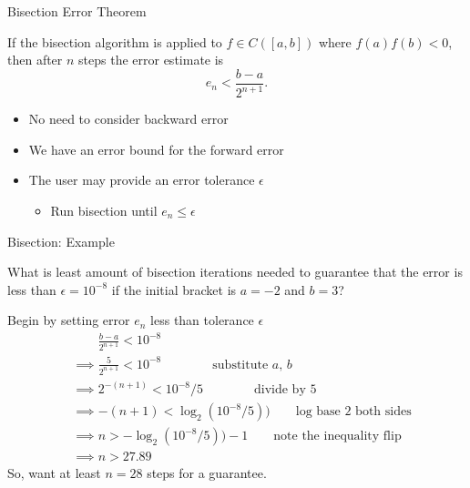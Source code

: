 \documentclass[10pt]{beamer}
\begin{document}
\begin{frame}{Bisection Error Theorem}

\begin{theorem}
    If the bisection algorithm is applied to $f\in C([a,b])$ where $f(a)f(b)<0$, then after $n$ steps the error estimate is 
    $$ e_n < \frac{b-a}{2^{n+1}}.$$
\end{theorem}
\vspace{4mm}
\begin{itemize}
    \item No need to consider backward error 
    \item We have an error bound for the forward error
    \item The user may provide an error tolerance $\epsilon$ 
    \begin{itemize}
        \item Run bisection until $e_n \le \epsilon$
    \end{itemize}
\end{itemize}


\end{frame}
\begin{frame}{Bisection: Example}

\begin{example}
What is least amount of bisection iterations needed to guarantee that the error is less than $\epsilon = 10^{-8}$ if the initial bracket is $a = -2$ and $b= 3$?
\end{example}

\vspace{3ex}
Begin by setting error $e_n$ less than tolerance $\epsilon $
\begin{align*}
&\phantom{\implies}\frac{b-a}{2^{n+1}}  < 10^{-8}\\
&\implies\frac{5}{2^{n+1}}  < 10^{-8} \qquad\qquad \mbox{substitute $a$, $b$}\\
&\implies{2^{-(n+1)}}  < 10^{-8}/5 \qquad\qquad \mbox{divide by 5}\\
&\implies -(n+1)  < \log_2(10^{-8}/5)) \qquad \mbox{log base 2 both sides}\\
&\implies n  > -\log_2(10^{-8}/5)) - 1\qquad \mbox{note the inequality flip}\\
&\implies n > 27.89
\end{align*}
So, want at least $n = 28$ steps for a guarantee.
\end{frame}
\end{document}
